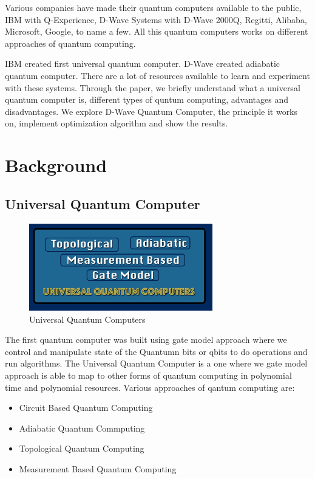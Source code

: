 \documentclass[12pt,conference]{IEEEtran}
\begin{document}
Various companies have made their quantum computers available to the public, IBM with Q-Experience, D-Wave Systems with D-Wave 2000Q, Regitti, Alibaba, Microsoft, Google, to name a few. All this quantum computers works on different approaches of quantum computing.\cite{2}

IBM created first universal quantum computer. D-Wave created adiabatic quantum computer.\cite{3} There are a lot of resources available to learn and experiment with these systems. Through the paper, we briefly understand what a universal quantum computer is, different types of quntum computing, advantages and disadvantages. We explore D-Wave Quantum Computer, the principle it works on, implement optimization algorithm and show the results. 


\section{Background}

\subsection{Universal Quantum Computer}

\begin{figure}[h]
  \centering
  \includegraphics[width=8cm]{uqc.png}
  \caption{Universal Quantum Computers}
  \label{fig:UniversalQC}
\end{figure}

The first quantum computer was built using gate model approach where we control and manipulate state of the Quantumn bits or qbits to do operations and run algorithms. The Universal Quantum Computer is a one where we gate model approach is able to map to other forms of quantum computing in polynomial time and polynomial resources. Various approaches of qantum computing are\cite{4}:
\begin{itemize}
  \item Circuit Based Quantum Computing
  \item Adiabatic Quantum Commputing
  \item Topological Quantum Computing
  \item Measurement Based Quantum Computing
\end{itemize}
\end{document}
